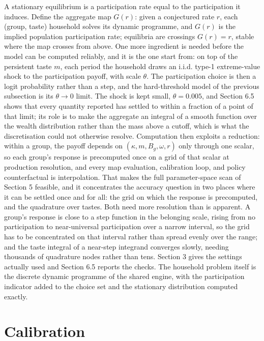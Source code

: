 \documentclass[11pt]{article}
\begin{document}
A stationary equilibrium is a participation rate equal to the participation it induces. Define the aggregate map $G(r)$: given a conjectured rate $r$, each (group, taste) household solves its dynamic programme, and $G(r)$ is the implied population participation rate; equilibria are crossings $G(r) = r$, stable where the map crosses from above. One more ingredient is needed before the model can be computed reliably, and it is the one \citet{brock2001} start from: on top of the persistent taste $m$, each period the household draws an i.i.d. type-1 extreme-value shock to the participation payoff, with scale $\theta$. The participation choice is then a logit probability rather than a step, and the hard-threshold model of the previous subsection is its $\theta \to 0$ limit. The shock is kept small, $\theta = 0.005$, and Section 6.5 shows that every quantity reported has settled to within a fraction of a point of that limit; its role is to make the aggregate an integral of a smooth function over the wealth distribution rather than the mass above a cutoff, which is what the discretisation could not otherwise resolve. Computation then exploits a reduction: within a group, the payoff depends on $(\kappa, m, B_g, \omega, r)$ only through one scalar, so each group's response is precomputed once on a grid of that scalar at production resolution, and every map evaluation, calibration loop, and policy counterfactual is interpolation. That makes the full parameter-space scan of Section 5 feasible, and it concentrates the accuracy question in two places where it can be settled once and for all: the grid on which the response is precomputed, and the quadrature over tastes. Both need more resolution than is apparent. A group's response is close to a step function in the belonging scale, rising from no participation to near-universal participation over a narrow interval, so the grid has to be concentrated on that interval rather than spread evenly over the range; and the taste integral of a near-step integrand converges slowly, needing thousands of quadrature nodes rather than tens. Section 3 gives the settings actually used and Section 6.5 reports the checks. The household problem itself is the discrete dynamic programme of the shared engine, with the participation indicator added to the choice set and the stationary distribution computed exactly.

\section{Calibration}
\end{document}
